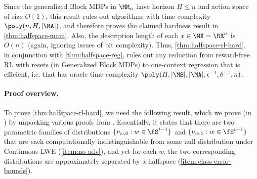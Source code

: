 Since the generalized Block MDPs in $\MM_n$ have horizon $H \leq n$ and action space of size $O(1)$, this result rules out algorithms with time complexity $\poly(n,H,|\MA|)$, and therefore proves the claimed hardness result in \cref{thm:halfspace-main}. Also, the description length of each $x \in \MX = \RR^n$ is $O(n)$ (again, ignoring issues of bit complexity). Thus, \cref{thm:halfspace-rl-hard}, in conjunction with \cref{thm:halfspace-reg}, rules out any reduction from reward-free RL with resets (in Generalized Block MDPs) to one-context regression that is efficient, i.e. that has oracle time complexity $\poly(H,|\MS|,|\MA|,\epsilon^{-1},\delta^{-1},n)$.

\paragraph{Proof overview.} To prove \cref{thm:halfspace-rl-hard}, we need the following result, which we prove (in ) by unpacking various proofs from \cite{tiegel2023hardness}. Essentially, it states that there are two parametric families of distributions $\{\nu_{w,0}: w \in \fS^{t-1}\}$ and $\{\nu_{w,1}: w \in \fS^{t-1}\}$ that are each computationally indistinguishable from some null distribution under Continuous LWE (\cref{item:no-adv}), and yet for each $w$, the two corresponding distributions are approximately separated by a halfspace (\cref{item:class-error-bounds}).

